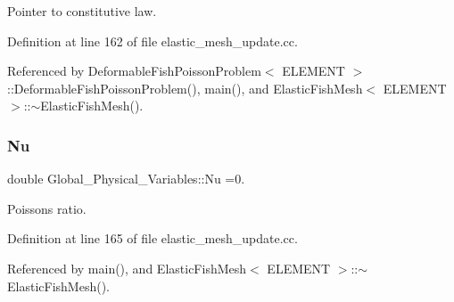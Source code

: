 Pointer to constitutive law. 



Definition at line 162 of file elastic\+\_\+mesh\+\_\+update.\+cc.



Referenced by Deformable\+Fish\+Poisson\+Problem$<$ E\+L\+E\+M\+E\+N\+T $>$\+::\+Deformable\+Fish\+Poisson\+Problem(), main(), and Elastic\+Fish\+Mesh$<$ E\+L\+E\+M\+E\+N\+T $>$\+::$\sim$\+Elastic\+Fish\+Mesh().

\mbox{\label{namespaceGlobal__Physical__Variables_a3962c36313826b19f216f6bbbdd6a477}} 
\subsubsection{\texorpdfstring{Nu}{Nu}}
{\footnotesize\ttfamily double Global\+\_\+\+Physical\+\_\+\+Variables\+::\+Nu =0.}



Poisson\textquotesingle{}s ratio. 



Definition at line 165 of file elastic\+\_\+mesh\+\_\+update.\+cc.



Referenced by main(), and Elastic\+Fish\+Mesh$<$ E\+L\+E\+M\+E\+N\+T $>$\+::$\sim$\+Elastic\+Fish\+Mesh().


